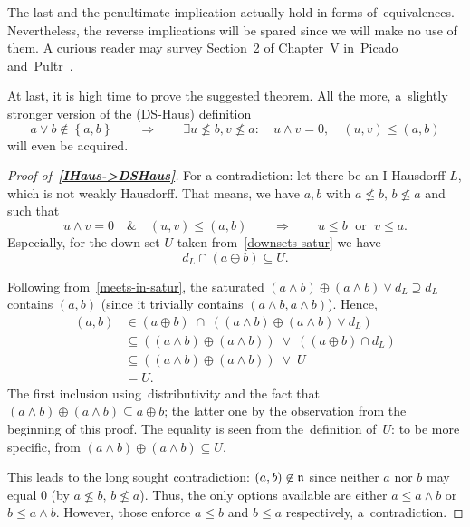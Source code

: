\begin{rem}
  The last and the penultimate implication actually hold in forms
  of~equivalences.
  Nevertheless, the reverse implications will be spared since we will make no
  use of them.
  A curious reader may survey Section~2 of Chapter~V in~Picado
  and~Pultr~\cite{picado-pultr12}.
\end{rem}

At last, it is high time to prove the suggested theorem.
All the more, a~slightly stronger version of the (DS-Haus) definition
\[
  a \vee b \not\in \left\{a, b\right\} \qquad \Rightarrow \qquad \exists
  u\not\leq b, v\not\leq a: \quad u \wedge v = 0, \quad \boxed{\left(u,
  v\right) \leq \left(a, b\right)}
\]
will even be acquired.

\begin{proof}[Proof of~{\bf \ref{IHaus->DSHaus}}\thinspace]
  For a contradiction: let there be an I-Hausdorff $L$, which is not weakly
  Hausdorff.
  That means, we have $a, b$ with $a \not\leq b, \, b \not\leq a$ and such that
  \[
    u \wedge v = 0 \quad \& \quad \left(u, v\right) \leq \left(a, b\right)
    \qquad \Longrightarrow \qquad
    u \leq b \; \textrm{ or } \; v \leq a.
  \]
  Especially, for the down-set $U$ taken from~\ref{downsets-satur} we have
  \[
    d_L \cap (a \oplus b) \subseteq U.
  \]

  Following from~\ref{meets-in-satur}\thinspace, the saturated $\left(a \wedge
  b\right) \oplus \left(a \wedge b\right) \vee d_L \supseteq d_L$ contains $(a,
  b)$ (since it trivially contains $\left( a \wedge b, a \wedge b \right)$).
  Hence,
  \begin{align*}
    (a, b) &\in (a \oplus b) \; \cap \; ((a \wedge b) \oplus (a \wedge b) \vee d_L) \\
           &\subseteq ((a \wedge b) \oplus (a \wedge b)) \; \vee \; ((a \oplus b) \cap d_L) \\
           &\subseteq ((a \wedge b) \oplus (a \wedge b)) \; \vee \; U \\
           &= U.
  \end{align*}
  The first inclusion using~distributivity and the fact that $(a \wedge b)
  \oplus (a \wedge b) \subseteq a \oplus b$;
  the latter one by the observation from the beginning of this proof.
  The equality is seen from the~definition of~$U$:
  to be more specific, from $(a \wedge b) \oplus (a \wedge b) \subseteq U$.

  This leads to the long sought contradiction:
  $(a, b)\not\in \mathfrak{n}$ since neither $a$ nor $b$ may equal $0$ (by $a \not\leq b,
  \, b \not\leq a$).
  Thus, the only options available are either $a \leq a \wedge b$ or $b \leq a
  \wedge b$.
  However, those enforce $a \leq b$ and $b \leq a$ respectively,
  a~contradiction. 
\end{proof}

